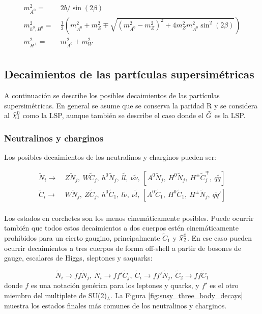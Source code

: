 \begin{equation}
	\begin{split}
		m_{A^0}^2 = &\ 2b/\sin(2\beta) \\
		m_{h^0 , H^0}^2 = &\ \frac{1}{2}\left( m_{A^0}^2 + m_Z^2 \mp \sqrt{(m_{A^0}^2-m_Z^2)^2 + 4m_Z^2 m_{A^0}^2 \sin^2(2\beta)} \right) \\
		m_{H^{\pm}}^2 = &\ m_{A^0}^2 + m_W^2 \\
	\end{split}
\end{equation}


\subsection{Decaimientos de las partículas supersimétricas}

A continuación se describe los posibles decaimientos de las partículas supersimétricas. En general se asume que se conserva la paridad R y se considera al $\ninoone$ como la LSP, aunque también se describe el caso donde el $\tilde{G}$ es la LSP.

\subsubsection{Neutralinos y charginos}

Los posibles decaimientos de los neutralinos y charginos pueden ser:

\begin{equation}
	\begin{split}
		\tilde{N}_i \to &\ Z\tilde{N}_j,\ W\tilde{C}_j,\ h^0\tilde{N}_j,\ l\tilde{l},\ \nu\tilde{\nu},\ [A^0\tilde{N}_j,\ H^0\tilde{N}_j,\ H^{\pm}\tilde{C}_j^{\mp},\ q\tilde{q}] \\
		\tilde{C}_i \to &\ W\tilde{N}_j,\ Z\tilde{C}_j,\ h^0\tilde{C}_1,\ l\tilde{\nu},\ \nu\tilde{l},\ [A^0\tilde{C}_1,\ H^0\tilde{C}_1,\ H^{\pm}\tilde{N}_j,\ q\tilde{q}'] \\
	\end{split}
\end{equation}

Los estados en corchetes son los menos cinemáticamente posibles. Puede ocurrir también que todos estos decaimientos a dos cuerpos estén cinemáticamente prohibidos para un cierto gaugino, principalmente $\tilde{C}_1$ y $\ninotwo$. En ese caso pueden ocurrir decaimientos a tres cuerpos de forma off-shell a partir de bosones de gauge, escalares de Higgs, sleptones y saquarks:

\begin{equation}
	\tilde{N}_i \to ff\tilde{N}_j,\ \tilde{N}_i \to ff'\tilde{C}_j,\ \tilde{C}_i \to ff'\tilde{N}_j,\ \tilde{C}_2 \to ff\tilde{C}_1
\end{equation}
%
donde $f$ es una notación genérica para los leptones y quarks, y $f'$ es el otro miembro del multiplete de SU(2)$_L$. La Figura \ref{fig:susy_three_body_decays} muestra los estados finales más comunes de los neutralinos y charginos.

